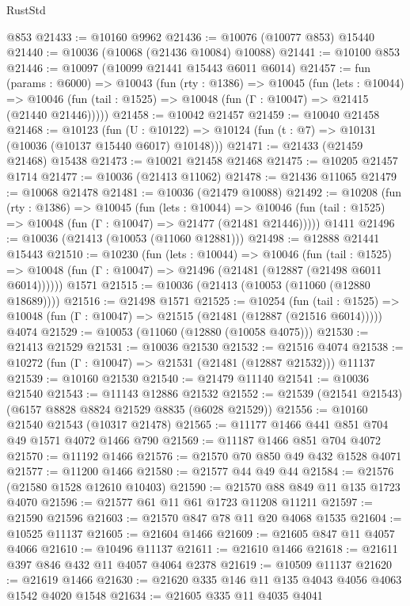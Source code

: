 \begin{lexlean}{RustStd}
\begin{coremodule}
{{    @853
@21433 := @10160 @9962
@21436 := @10076 (@10077 @853) @15440
@21440 := @10036 (@10068 (@21436 @10084) @10088)
@21441 := @10100 @853
@21446 := @10097 (@10099 @21441 @15443 @6011 @6014)
@21457 := fun (params : @6000) =>
  @10043
    (fun (rty : @1386) =>
    @10045
      (fun (lets : @10044) =>
      @10046 (fun (tail : @1525) => @10048 (fun (Γ : @10047) => @21415 (@21440 @21446)))))
@21458 := @10042 @21457
@21459 := @10040 @21458
@21468 := @10123
    (fun (U : @10122) => @10124 (fun (t : @7) => @10131 (@10036 (@10137 @15440 @6017) @10148)))
@21471 := @21433 (@21459 @21468) @15438
@21473 := @10021 @21458 @21468
@21475 := @10205 @21457 @1714
@21477 := @10036 (@21413 @11062)
@21478 := @21436 @11065
@21479 := @10068 @21478
@21481 := @10036 (@21479 @10088)
@21492 := @10208
    (fun (rty : @1386) =>
    @10045
      (fun (lets : @10044) =>
      @10046 (fun (tail : @1525) => @10048 (fun (Γ : @10047) => @21477 (@21481 @21446)))))
    @1411
@21496 := @10036 (@21413 (@10053 (@11060 @12881)))
@21498 := @12888 @21441 @15443
@21510 := @10230
    (fun (lets : @10044) =>
    @10046
      (fun (tail : @1525) =>
      @10048 (fun (Γ : @10047) => @21496 (@21481 (@12887 (@21498 @6011 @6014))))))
    @1571
@21515 := @10036 (@21413 (@10053 (@11060 (@12880 @18689))))
@21516 := @21498 @1571
@21525 := @10254
    (fun (tail : @1525) => @10048 (fun (Γ : @10047) => @21515 (@21481 (@12887 (@21516 @6014)))))
    @4074
@21529 := @10053 (@11060 (@12880 (@10058 @4075)))
@21530 := @21413 @21529
@21531 := @10036 @21530
@21532 := @21516 @4074
@21538 := @10272 (fun (Γ : @10047) => @21531 (@21481 (@12887 @21532))) @11137
@21539 := @10160 @21530
@21540 := @21479 @11140
@21541 := @10036 @21540
@21543 := @11143 @12886 @21532
@21552 := @21539 (@21541 @21543) (@6157 @8828 @8824 @21529 @8835 (@6028 @21529))
@21556 := @10160 @21540 @21543 (@10317 @21478)
@21565 := @11177 @1466 @441 @851 @704 @49 @1571 @4072 @1466 @790
@21569 := @11187 @1466 @851 @704 @4072
@21570 := @11192 @1466
@21576 := @21570 @70 @850 @49 @432 @1528 @4071
@21577 := @11200 @1466
@21580 := @21577 @44 @49 @44
@21584 := @21576 (@21580 @1528 @12610 @10403)
@21590 := @21570 @88 @849 @11 @135 @1723 @4070
@21596 := @21577 @61 @11 @61 @1723 @11208 @11211
@21597 := @21590 @21596
@21603 := @21570 @847 @78 @11 @20 @4068 @1535
@21604 := @10525 @11137
@21605 := @21604 @1466
@21609 := @21605 @847 @11 @4057 @4066
@21610 := @10496 @11137
@21611 := @21610 @1466
@21618 := @21611 @397 @846 @432 @11 @4057 @4064 @2378
@21619 := @10509 @11137
@21620 := @21619 @1466
@21630 := @21620 @335 @146 @11 @135 @4043 @4056 @4063 @1542 @4020 @1548
@21634 := @21605 @335 @11 @4035 @4041
}}
\end{coremodule}
\end{lexlean}
